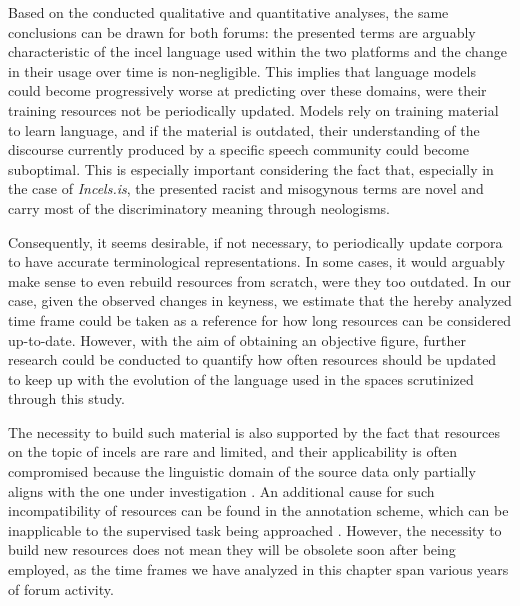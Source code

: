 \documentclass[11pt]{article}
\newcommand{\enforum}{\textit{Incels.is}}
\newcommand{\itforum}{\textit{Il forum dei brutti}}
\begin{document}

Based on the conducted qualitative and quantitative analyses, the same conclusions can be drawn for both forums: the presented terms are arguably characteristic of the incel language used within the two platforms and the change in their usage over time is non-negligible. This implies that language models could become progressively worse at predicting over these domains, were their training resources not be periodically updated. Models rely on training material to learn language, and if the material is outdated, their understanding of the discourse currently produced by a specific speech community could become suboptimal. This is especially important considering the fact that, especially in the case of \enforum, the presented racist and misogynous terms are novel and carry most of the discriminatory meaning through neologisms.

Consequently, it seems desirable, if not necessary, to periodically update corpora to have accurate terminological representations. In some cases, it would arguably make sense to even rebuild resources from scratch, were they too outdated. In our case, given the observed changes in keyness, we estimate that the hereby analyzed time frame could be taken as a reference for how long resources can be considered up-to-date. However, with the aim of obtaining an objective figure, further research could be conducted to quantify how often resources should be updated to keep up with the evolution of the language used in the spaces scrutinized through this study.

The necessity to build such material is also supported by the fact that resources on the topic of incels are rare and limited, and their applicability is often compromised because the linguistic domain of the source data only partially aligns with the one under investigation \cite{pelzer-2021-toxic-language-incel-communities}. An additional cause for such incompatibility of resources can be found in the annotation scheme, which can be inapplicable to the supervised task being approached \cite{zhou-2022-automated-hs-detection}. However, the necessity to build new resources does not mean they will be obsolete soon after being employed, as the time frames we have analyzed in this chapter span various years of forum activity.
\end{document}
